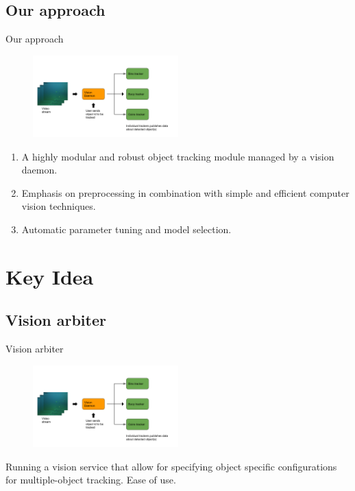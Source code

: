 \documentclass{beamer}
\begin{document}
\subsection{Our approach}
\begin{frame}{Our approach}
    \begin{figure}[ht]
        \centering
        \includegraphics[width=0.5\textwidth]{figs/overall_vision_architecture.png}
    \end{figure}
    \begin{enumerate}
        \item A highly modular and robust object tracking module managed by a vision daemon.
        \item Emphasis on preprocessing in combination with simple and efficient computer vision techniques.
        \item Automatic parameter tuning and model selection.
    \end{enumerate}
\end{frame}



\section{Key Idea}

\subsection{Vision arbiter}
\begin{frame}{Vision arbiter}
    \begin{figure}[ht]
        \centering
        \includegraphics[width=0.5\textwidth]{figs/overall_vision_architecture.png}
    \end{figure}
    Running a vision service that allow for specifying object specific configurations for multiple-object tracking. Ease of use.
\end{frame}
\end{document}
